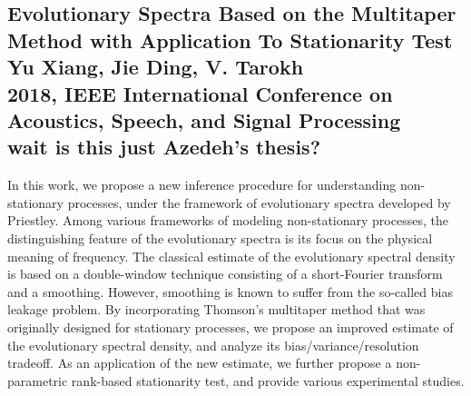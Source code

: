 \documentclass{article}
\begin{document}
\subsection{Evolutionary Spectra Based on the Multitaper Method with Application To Stationarity Test \\
Yu Xiang, Jie Ding, V. Tarokh \\
2018, IEEE International Conference on Acoustics, Speech, and Signal Processing \\[10pt] wait is this just Azedeh's thesis?}
In this work, we propose a new inference procedure for understanding non-stationary processes, under the framework of evolutionary spectra developed by Priestley. Among various frameworks of modeling non-stationary processes, the distinguishing feature of the evolutionary spectra is its focus on the physical meaning of frequency. The classical estimate of the evolutionary spectral density is based on a double-window technique consisting of a short-Fourier transform and a smoothing. However, smoothing is known to suffer from the so-called bias leakage problem. By incorporating Thomson's multitaper method that was originally designed for stationary processes, we propose an improved estimate of the evolutionary spectral density, and analyze its bias/variance/resolution tradeoff. As an application of the new estimate, we further propose a non-parametric rank-based stationarity test, and provide various experimental studies. \\

\\
\end{document}
